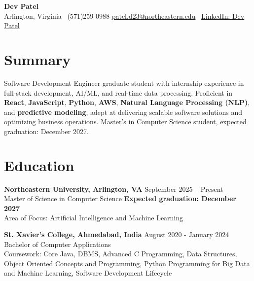 \documentclass[a4paper,10pt]{article}
\begin{document}
\begin{center}
\vspace{-3mm}
    \fontsize{16}{18}\selectfont \textbf{Dev Patel} \\
    \vspace{0mm}
    \normalsize Arlington, Virginia \textbar\ (571)259-0988  \textbar       \href{mailto:patel.d23@northeastern.edu}{patel.d23@northeastern.edu} \textbar\ \href{https://www.linkedin.com/in/devxpatel//}{LinkedIn: Dev Patel} \\
\end{center}



\section*{Summary}
Software Development Engineer graduate student with internship experience in full-stack development, AI/ML, and real-time data processing. Proficient in \textbf{React}, \textbf{JavaScript}, \textbf{Python}, \textbf{AWS}, \textbf{Natural Language Processing (NLP)}, and \textbf{predictive modeling}, adept at delivering scalable software solutions and optimizing business operations. Master's in Computer Science student, expected graduation: December 2027.
 
\vspace{ 0 mm}
\section*{Education}
\textbf{Northeastern University, Arlington, VA} \hfill September 2025 -- Present\\
Master of Science in Computer Science \hfill \textbf{Expected graduation: December 2027} \\
Area of Focus: Artificial Intelligence and Machine Learning

\vspace{1 mm} %
\textbf{St. Xavier's College, Ahmedabad, India} \hfill August 2020 - January 2024 \\
Bachelor of Computer Applications\\
Coursework: Core Java, DBMS, Advanced C Programming, Data Structures, Object Oriented Concepts and Programming, Python Programming for Big Data and Machine Learning, Software Development Lifecycle
\end{document}
